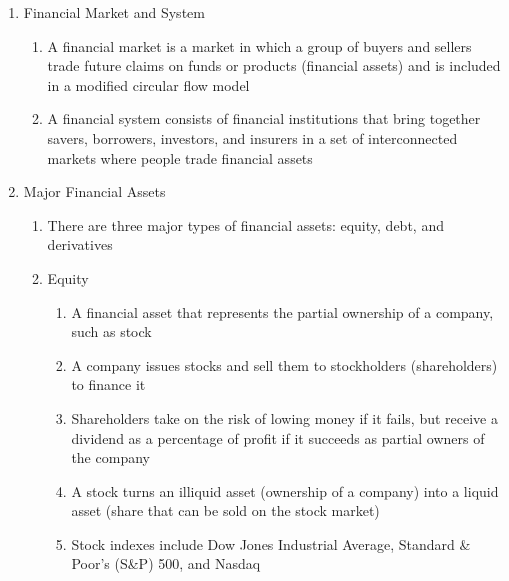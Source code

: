\documentclass[12pt]{article}
\begin{document}
\begin{enumerate}
\begin{enumerate}
        \end{enumerate}

      \item Financial Market and System

        \begin{enumerate}

          \item A financial market is a market in which a group of buyers and sellers trade future claims on funds or products (financial assets) and is included in a modified circular flow model

          \item A financial system consists of financial institutions that bring together savers, borrowers, investors, and insurers in a set of interconnected markets where people trade financial assets

        \end{enumerate}

      \item Major Financial Assets

        \begin{enumerate}

          \item There are three major types of financial assets: equity, debt, and derivatives

          \item Equity

            \begin{enumerate}

              \item A financial asset that represents the partial ownership of a company, such as stock

              \item A company issues stocks and sell them to stockholders (shareholders) to finance it

              \item Shareholders take on the risk of lowing money if it fails, but receive a dividend as a percentage of profit if it succeeds as partial owners of the company

              \item A stock turns an illiquid asset (ownership of a company) into a liquid asset (share that can be sold on the stock market)

              \item Stock indexes include Dow Jones Industrial Average, Standard \& Poor's (S\&P) 500, and Nasdaq


\end{enumerate}
\end{enumerate}
\end{enumerate}
\end{document}
